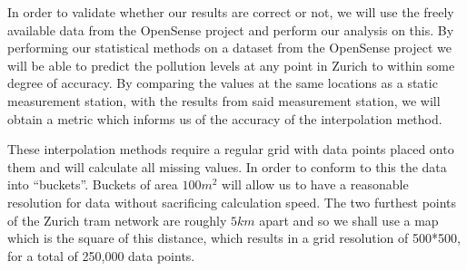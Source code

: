 	In order to validate whether our results are correct or not, we will use the freely available data from the OpenSense project and perform our analysis on this. By performing our statistical methods on a dataset from the OpenSense project we will be able to predict the pollution levels at any point in Zurich to within some degree of accuracy. By comparing the values at the same locations as a static measurement station, with the results from said measurement station, we will obtain a metric which informs us of the accuracy of the interpolation method.











        These interpolation methods require a regular grid with data points placed onto them and will calculate all missing values. In order to conform to this the data into ``buckets''. Buckets of area $100m^{2}$ will allow us to have a reasonable resolution for data without sacrificing calculation speed. The two furthest points of the Zurich tram network are roughly $5km$ apart and so we shall use a map which is the square of this distance, which results in a grid resolution of 500*500, for a total of 250,000 data points. 
